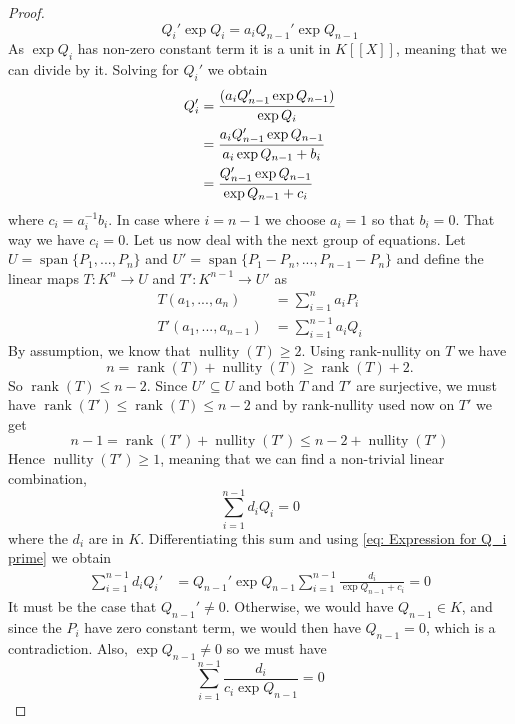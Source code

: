 \documentclass{article}
\DeclareMathOperator{\rank}{rank}
\DeclareMathOperator{\nullity}{nullity}
\newcommand{\Span}{\operatorname{span}}
\numberwithin{equation}{section}
\begin{document}
\begin{proof}
	$$Q_i' \exp Q_i = a_i Q_{n-1}' \exp Q_{n-1}$$
	As $\exp Q_i$ has non-zero constant term it is a unit in $K[[X]]$, meaning that we can divide by it. Solving for $Q_i'$ we obtain
	\begin{align}\label{eq: Expression for Q_i prime}
    	Q_i' & = \frac{(a_i Q_{n-1}' \exp Q_{n-1})}{\exp Q_i} \notag  	\\
         	& = \frac{a_i Q_{n-1}' \exp Q_{n-1}}{a_i \exp Q_{n-1} + b_i} \\
         	& = \frac{Q_{n-1}' \exp Q_{n-1}}{\exp Q_{n-1} + c_i} \notag
	\end{align}
	where $c_i = a_i^{-1}b_i$. In case where $i = n-1$ we choose $a_{i} = 1$ so that $b_{i} = 0$. That way we have $c_i = 0$. Let us now deal with the next group of equations. Let $U = \Span \{P_1, ..., P_n \}$ and $U' = \Span \{P_1 - P_n, ..., P_{n-1} - P_n \}$ and define the linear maps $T : K^n \to U$ and $T' : K^{n-1} \to U'$ as
	\begin{align*}
    	T(a_1, ..., a_n)  	& = \sum_{i=1}^n a_i P_i 	\\
    	T'(a_1, ..., a_{n-1}) & = \sum_{i=1}^{n-1} a_i Q_i
	\end{align*}
	By assumption, we know that $\nullity(T) \geq 2$. Using rank-nullity on $T$ we have
	$$n = \rank(T) + \nullity(T) \geq \rank(T) + 2.$$
	So $\rank(T) \leq n-2$. Since $U' \subseteq U$ and both $T$ and $T'$ are surjective, we must have $\rank(T') \leq \rank(T) \leq n-2$ and by rank-nullity used now on $T'$ we get
	$$n-1 = \rank(T') + \nullity(T') \leq n-2 + \nullity(T')$$
	Hence $\nullity(T') \geq 1$, meaning that we can find a non-trivial linear combination,
	\begin{equation}\label{eq: Non trivial Q_i linear combination}
    	\sum_{i=1}^{n-1} d_i Q_i = 0
	\end{equation}
	where the $d_i$ are in $K$. Differentiating this sum and using \cref{eq: Expression for Q_i prime} we obtain
	\begin{align*}
    	\sum_{i=1}^{n-1} d_i Q_i' & = Q_{n-1}' \exp Q_{n-1} \sum_{i=1}^{n-1} \frac{d_i}{\exp Q_{n-1} + c_i} = 0
	\end{align*}
	It must be the case that $Q_{n-1}' \neq 0$. Otherwise, we would have $Q_{n-1} \in K$, and since the $P_i$ have zero constant term, we would then have $Q_{n-1} = 0$, which is a contradiction. Also, $\exp Q_{n-1} \neq 0$ so we must have
	\begin{equation}\label{eq: Zero equation}
    	\sum_{i=1}^{n-1} \frac{d_i}{c_i \exp Q_{n-1}} = 0
	\end{equation}

\end{proof}
\end{document}
